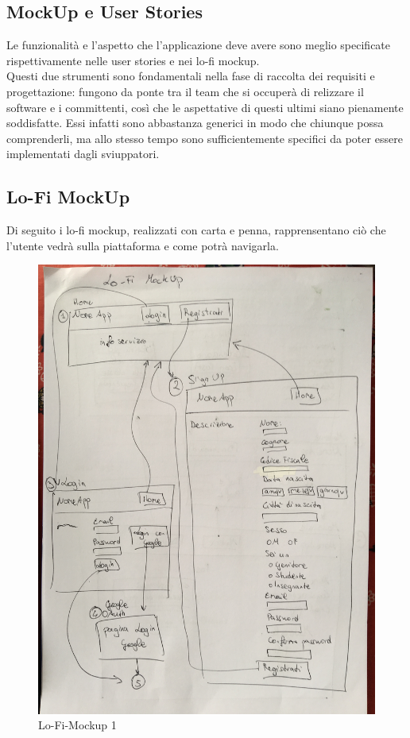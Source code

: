 \documentclass[Lau, binding=0.6cm]{sapthesis}
\begin{document}
\subsection{MockUp e User Stories}

Le funzionalità e l'aspetto che l'applicazione deve avere sono meglio specificate rispettivamente nelle user stories e nei lo-fi mockup.\\
Questi due strumenti sono fondamentali nella fase di raccolta dei requisiti e progettazione: fungono da ponte tra il team che si occuperà di relizzare il software e i committenti, così che le aspettative di questi ultimi siano pienamente soddisfatte. Essi infatti sono abbastanza generici in modo che chiunque possa comprenderli, ma allo stesso tempo sono sufficientemente specifici da poter essere implementati dagli sviuppatori.

\newpage
\subsection{Lo-Fi MockUp}

Di seguito i lo-fi mockup, realizzati con carta e penna, rapprensentano ciò che l'utente vedrà sulla piattaforma e come potrà navigarla.\\

\begin{figure}[H]
	\centering
	\includegraphics[width=1.3\linewidth, angle=-90]{images/mockup_1}
	\caption{Lo-Fi-Mockup 1}
	\label{fig:mockup_1}
\end{figure}
\end{document}
